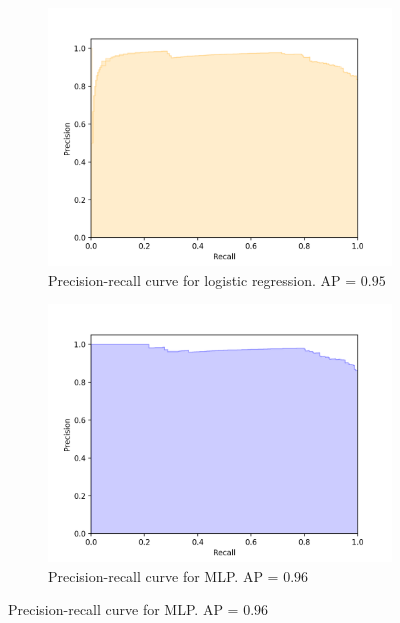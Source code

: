 		\begin{figure}[H]
			\centering
			\begin{subfigure}{.4\textwidth}
				\includegraphics[width=\textwidth]{graphics/precision-recall/logreg}
				\caption{Precision-recall curve for logistic regression. AP = $0.95$}
				\label{Fig: eval/ml/results/precision-recall/logreg}
			\end{subfigure} \hfill
			\begin{subfigure}{.4\textwidth}
				\includegraphics[width=\textwidth]{graphics/precision-recall/mlp}
				\caption{Precision-recall curve for MLP.  AP = $0.96$}
				\label{Fig: eval/ml/results/precision-recall/mlp}
			\end{subfigure}

\end{figure}
